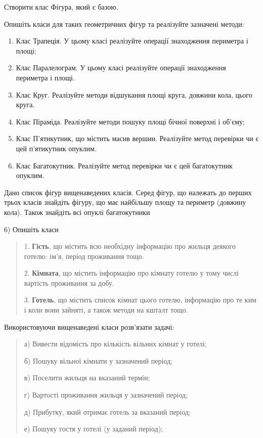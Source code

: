 \documentclass[]{article}
\begin{document}
Створити клас Фігура, який є базою.

Опишіть класи для таких геометричних фігур та реалізуйте зазначені
методи:

\begin{enumerate}
\def\labelenumi{\alph{enumi})}
\item
  Клас Трапеція. У цьому класі реалізуйте операції знаходження периметра
  і площі;
\item
  Клас Паралелограм. У цьому класі реалізуйте операції знаходження
  периметра і площі.
\item
  Клас Круг. Реалізуйте методи відшукання площі круга, довжини кола,
  цього круга.
\item
  Клас Піраміда. Реалізуйте методи пошуку площі бічної поверхні і
  об'єму;
\item
  Клас П'ятикутник, що містить масив вершин. Реалізуйте метод перевірки
  чи є цей п'ятикутник опуклим.
\item
  Клас Багатокутник. Реалізуйте метод перевірки чи є цей багатокутник
  опуклим.
\end{enumerate}

Дано список фігур вищенаведених класів. Серед фігур, що належать до
перших трьох класів знайдіть фігуру, що має найбільшу площу та периметр
(довжину кола). Також знайдіть всі опуклі багатокутники

6) Опишіть класи

\begin{quote}
1. \textbf{Гість}, що містить всю необхідну інформацію про жильця
деякого готелю: ім'я, період проживання тощо.

2. \textbf{Кімната}, що містить інформацію про кімнату готелю у тому
числі вартість проживання за добу.

3. \textbf{Готель}, що містить список кімнат цього готелю, інформацію
про те ким і коли вони зайняті, а також методи на кшталт тощо.
\end{quote}

Використовуючи вищенаведені класи розв'язати задачі:

\begin{quote}
а) Вивести відомість про кількість вільних кімнат у готелі;

б) Пошуку вільної кімнати у зазначений період;

в) Поселити жильця на вказаний термін;

г) Вартості проживання жильця у зазначений період;

д) Прибутку, який отримає готель за вказаний період;

е) Пошуку гостя у готелі (у заданий період);
\end{quote}
\end{document}
